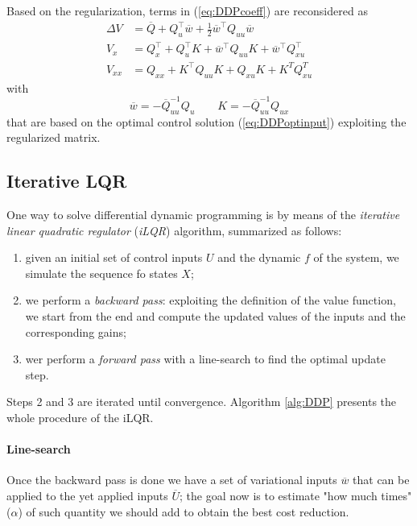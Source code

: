 	Based on the regularization, terms in (\ref{eq:DDPcoeff}) are reconsidered as
	\begin{equation} \label{eq:temp:5}
		\begin{aligned}
			\Delta V & = \overline Q + Q_u^\top \overline w + \frac 1 2 \overline w^\top Q_{uu
			} \overline w \\ 
			V_x & = Q_x^\top + Q_u^\top K + \overline w^\top Q_{uu}K + \overline w^\top Q_{xu}^\top \\
			V_{xx} & = Q_{xx} + K^\top Q_{uu}K + Q_{xu}K + K^T Q_{xu}^T 
		\end{aligned}
	\end{equation}
	with
	\begin{equation} \label{eq:temp:7}
		\overline w = - \overline Q_{uu}^{-1}Q_u \qquad K = - \overline Q_{uu}^{-1} Q_{ux}
	\end{equation}
	that are based on the optimal control solution (\ref{eq:DDPoptinput}) exploiting the regularized matrix.
	
\subsection{Iterative LQR}
	One way to solve differential dynamic programming is by means of the \textit{iterative linear quadratic regulator} (\textit{iLQR}) algorithm, summarized as follows:
	\begin{enumerate}
		\item given an initial set of control inputs $U$ and the dynamic $f$ of the system, we simulate the sequence fo states $X$;
		\item we perform a \textit{backward pass}: exploiting the definition of the value function, we start from the end and compute the updated values of the inputs and the corresponding gains;
		\item wer perform a \textit{forward pass} with a line-search to find the optimal update step.
	\end{enumerate}
	Steps 2 and 3 are iterated until convergence. Algorithm \ref{alg:DDP} presents the whole procedure of the iLQR.
	
	
	
	\paragraph{Line-search} Once the backward pass is done we have a set of variational inputs $\overline w$ that can be applied to the yet applied inputs $\overline U$; the goal now is to estimate "how much times" ($\alpha$) of such quantity we should add to obtain the best cost reduction.
	
